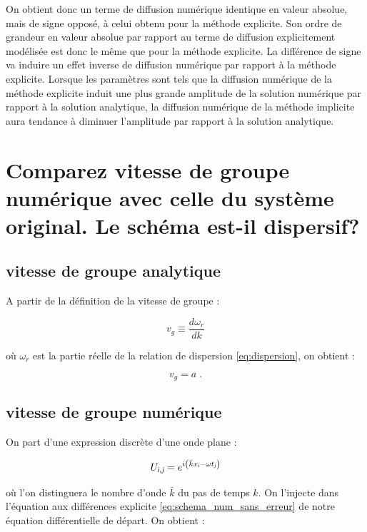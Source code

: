 \documentclass[a4paper, 12pt]{report}
\begin{document}
On obtient donc un terme de diffusion numérique identique en valeur absolue,
mais de signe opposé, à celui obtenu pour la méthode explicite. Son ordre
de grandeur en valeur absolue par rapport au terme de diffusion explicitement
modélisée est donc le même que pour la méthode explicite. La différence de signe
va induire un effet inverse de diffusion numérique par rapport à la méthode
explicite. Lorsque les paramètres sont tels que la diffusion numérique de la
méthode explicite induit une plus grande amplitude de la solution numérique par
rapport à la solution analytique, la diffusion numérique de la méthode implicite
aura tendance à diminuer l'amplitude par rapport à la solution analytique.


\section{Comparez vitesse de groupe numérique avec celle du système original. Le schéma est-il dispersif?}

\subsection*{vitesse de groupe analytique}

A partir de la définition de la vitesse de groupe :

\begin{equation}
 v_{g} \equiv \frac{d\omega_{r}}{dk}
\end{equation}

où $\omega_{r}$ est la partie réelle de la relation de dispersion \eqref{eq:dispersion}, on obtient :

\begin{equation}
 v_{g} = a\;.
\end{equation}

\subsection*{vitesse de groupe numérique}

On part d'une expression discrète d'une onde plane :

\begin{equation}
  U_{\textsl{i},\textsl{j}} = e^{i\left(\bar{k}x_{\textsl{i}}-\omega t_{\textsl{j}}\right)}
\end{equation}

où l'on distinguera le nombre d'onde $\bar{k}$ du pas de temps $k$. On l'injecte dans l'équation aux différences explicite \eqref{eq:schema_num_sans_erreur} de notre équation différentielle de départ. On obtient :
\end{document}
